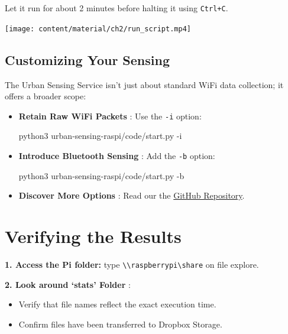 \documentclass[
  letterpaper,
]{scrbook}
\newenvironment{Shaded}{\begin{snugshade}}{\end{snugshade}}
\newcommand{\AttributeTok}[1]{\textcolor[rgb]{0.40,0.45,0.13}{#1}}
\newcommand{\ExtensionTok}[1]{\textcolor[rgb]{0.00,0.23,0.31}{#1}}
\newcommand{\NormalTok}[1]{\textcolor[rgb]{0.00,0.23,0.31}{#1}}
\providecommand{\tightlist}{%
  \setlength{\itemsep}{0pt}\setlength{\parskip}{0pt}}\usepackage{longtable,booktabs,array}
\begin{document}
Let it run for about 2 minutes before halting it using \texttt{Ctrl+C}.

\texttt{[image: content/material/ch2/run\_script.mp4]}

\subsection{Customizing Your Sensing}\label{customizing-your-sensing}

The Urban Sensing Service isn't just about standard WiFi data
collection; it offers a broader scope:

\begin{itemize}
\item
  \textbf{Retain Raw WiFi Packets} : Use the \texttt{-i} option:

\begin{Shaded}
\begin{Highlighting}[]
\ExtensionTok{python3}\NormalTok{ urban{-}sensing{-}raspi/code/start.py }\AttributeTok{{-}i}
\end{Highlighting}
\end{Shaded}
\item
  \textbf{Introduce Bluetooth Sensing} : Add the \texttt{-b} option:

\begin{Shaded}
\begin{Highlighting}[]
\ExtensionTok{python3}\NormalTok{ urban{-}sensing{-}raspi/code/start.py }\AttributeTok{{-}b}
\end{Highlighting}
\end{Shaded}
\item
  \textbf{Discover More Options} : Read our the
  \href{https://github.com/urbanjuhyeon/urban-sensing-raspi}{GitHub
  Repository}.
\end{itemize}

\section{Verifying the Results}\label{verifying-the-results}

\textbf{1. Access the Pi folder:} type
\texttt{\textbackslash{}\textbackslash{}raspberrypi\textbackslash{}share}
on file explore.

\textbf{2. Look around `stats' Folder} :

\begin{itemize}
\tightlist
\item
  Verify that file names reflect the exact execution time.
\item
  Confirm files have been transferred to Dropbox Storage.
\end{itemize}
\end{document}
